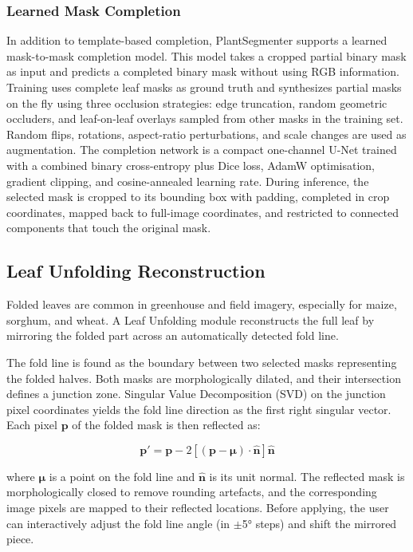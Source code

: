\documentclass[12pt, a4paper]{article}
\begin{document}
\subsubsection{Learned Mask Completion}

In addition to template-based completion, PlantSegmenter supports a learned mask-to-mask completion model. This model takes a cropped partial binary mask as input and predicts a completed binary mask without using RGB information. Training uses complete leaf masks as ground truth and synthesizes partial masks on the fly using three occlusion strategies: edge truncation, random geometric occluders, and leaf-on-leaf overlays sampled from other masks in the training set. Random flips, rotations, aspect-ratio perturbations, and scale changes are used as augmentation. The completion network is a compact one-channel U-Net trained with a combined binary cross-entropy plus Dice loss, AdamW optimisation, gradient clipping, and cosine-annealed learning rate. During inference, the selected mask is cropped to its bounding box with padding, completed in crop coordinates, mapped back to full-image coordinates, and restricted to connected components that touch the original mask.


\subsection{Leaf Unfolding Reconstruction}
\label{sec:unfolding}

Folded leaves are common in greenhouse and field imagery, especially for maize, sorghum, and wheat. A Leaf Unfolding module reconstructs the full leaf by mirroring the folded part across an automatically detected fold line.

The fold line is found as the boundary between two selected masks representing the folded halves. Both masks are morphologically dilated, and their intersection defines a junction zone. Singular Value Decomposition (SVD) on the junction pixel coordinates yields the fold line direction as the first right singular vector. Each pixel $\mathbf{p}$ of the folded mask is then reflected as:

\begin{equation}
    \mathbf{p}' = \mathbf{p} - 2\left[(\mathbf{p} - \boldsymbol{\mu}) \cdot
    \hat{\mathbf{n}}\right]\hat{\mathbf{n}}
    \label{eq:reflection}
\end{equation}

where $\boldsymbol{\mu}$ is a point on the fold line and $\hat{\mathbf{n}}$ is its unit normal. The reflected mask is morphologically closed to remove rounding artefacts, and the corresponding image pixels are mapped to their reflected locations. Before applying, the user can interactively adjust the fold line angle (in $\pm$5° steps) and shift the mirrored piece.
\end{document}
